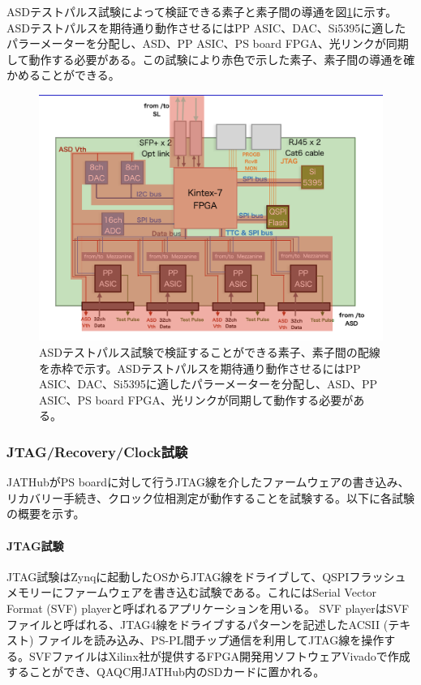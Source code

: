 ASDテストパルス試験によって検証できる素子と素子間の導通を図\ref{QAQCasdtpelements}に示す。ASDテストパルスを期待通り動作させるにはPP ASIC、DAC、Si5395に適したパラーメーターを分配し、ASD、PP ASIC、PS board FPGA、光リンクが同期して動作する必要がある。この試験により赤色で示した素子、素子間の導通を確かめることができる。
\baselineskip

\begin{figure} 
\centering
\includegraphics[width=16cm]{fig/QAQC/QAQCasdtpelements.png}
\caption[ASDテストパルス試験で検証できる素子]{ASDテストパルス試験で検証することができる素子、素子間の配線を赤枠で示す。ASDテストパルスを期待通り動作させるにはPP ASIC、DAC、Si5395に適したパラーメーターを分配し、ASD、PP ASIC、PS board FPGA、光リンクが同期して動作する必要がある。}
\label{QAQCasdtpelements}
\end{figure}

\subsubsection{JTAG/Recovery/Clock試験}
\baselineskip

\label{subsubsec_jtag}
JATHubがPS boardに対して行うJTAG線を介したファームウェアの書き込み、リカバリー手続き、クロック位相測定が動作することを試験する。以下に各試験の概要を示す。

\paragraph{JTAG試験}\par
JTAG試験はZynqに起動したOSからJTAG線をドライブして、QSPIフラッシュメモリーにファームウェアを書き込む試験である。これにはSerial Vector Format (SVF) playerと呼ばれるアプリケーションを用いる。
SVF playerはSVFファイルと呼ばれる、JTAG4線をドライブするパターンを記述したACSII (テキスト) ファイルを読み込み、PS-PL間チップ通信を利用してJTAG線を操作する。SVFファイルはXilinx社が提供するFPGA開発用ソフトウェアVivadoで作成することができ、QAQC用JATHub内のSDカードに置かれる。
\baselineskip

